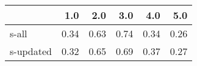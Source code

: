 \begin{tabular}{lrrrrr}
\toprule
{} &  1.0 &  2.0 &  3.0 &  4.0 &  5.0 \\
\midrule
s-all     & 0.34 & 0.63 & 0.74 & 0.34 & 0.26 \\
s-updated & 0.32 & 0.65 & 0.69 & 0.37 & 0.27 \\
\bottomrule
\end{tabular}
